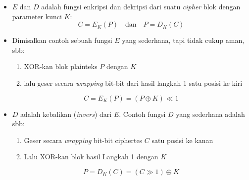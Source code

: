 \documentclass{article}
\begin{document}

\begin{itemize}
    \item $E$ dan $D$ adalah fungsi enkripsi dan dekripsi dari suatu \textit{cipher} blok dengan parameter kunci $K$:
    \[ C = E_K(P) \quad \text{dan} \quad P = D_K(C) \]
    \item Dimisalkan contoh sebuah fungsi $E$ yang sederhana, tapi tidak cukup aman, sbb:
    \begin{enumerate}
        \item XOR-kan blok plainteks $P$ dengan $K$
        \item lalu geser secara \textit{wrapping} bit-bit dari hasil langkah 1 satu posisi ke kiri
    \end{enumerate}
    \[ C = E_K(P) = (P \oplus K) \ll 1 \]
    \item $D$ adalah kebalikan (\textit{invers}) dari $E$. Contoh fungsi $D$ yang sederhana adalah sbb:
    \begin{enumerate}
        \item Geser secara \textit{wrapping} bit-bit ciphertes $C$ satu posisi ke kanan
        \item Lalu XOR-kan blok hasil Langkah 1 dengan $K$
    \end{enumerate}
    \[ P = D_K(C) = (C \gg 1) \oplus K \]
\end{itemize}
\end{document}
